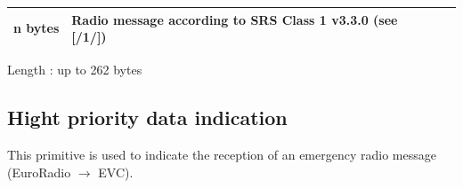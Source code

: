 \documentclass[nocc]{template/openetcs_report}
\begin{document}
\begin{longtable}{|l|l|l|}
				\hline
					 \begin{minipage}[t]{0.1\linewidth}n bytes \end{minipage}
					&\begin{minipage}[t]{0.6\linewidth}Radio message according to SRS Class 1 v3.3.0 (see [/1/])	\end{minipage}
					&\begin{minipage}[t]{0.3\linewidth}\end{minipage} \\
					
				\hline	
			\end{longtable}
			Length : up to 262 bytes
\subsection{Hight priority data indication}
This primitive is used to indicate the reception of an emergency radio message (EuroRadio $\rightarrow$ EVC).
\end{document}
